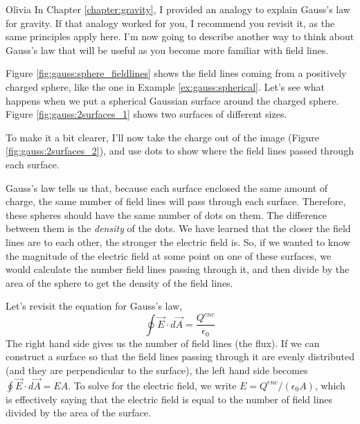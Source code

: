 \begin{studentOpinion}{Olivia}
In Chapter \ref{chapter:gravity}, I provided an analogy to explain Gauss's law for gravity. If that analogy worked for you, I recommend you revisit it, as the same principles apply here. I'm now going to describe another way to think about Gauss's law that will be useful as you become more familiar with field lines.

Figure \ref{fig:gauss:sphere_fieldlines} shows the field lines coming from a positively charged sphere, like the one in Example \ref{ex:gauss:spherical}. 
Let's see what happens when we put a spherical Gaussian surface around the charged sphere. Figure \ref{fig:gauss:2surfaces_1} shows two surfaces of different sizes.

To make it a bit clearer, I'll now take the charge out of the image (Figure \ref{fig:gauss:2surfaces_2}), and use dots to show where the field lines passed through each surface. 

Gauss's law tells us that, because each surface enclosed the same amount of charge, the same number of field lines will pass through each surface. Therefore, these spheres should have the same number of dots on them. The difference between them is the \textit{density} of the dots. We have learned that the closer the field lines are to each other, the stronger the electric field is. So, if we wanted to know the magnitude of the electric field at some point on one of these surfaces, we would calculate the number field lines passing through it, and then divide by the area of the sphere to get the density of the field lines. 

Let's revisit the equation for Gauss's law,
 \begin{equation}
 \oint \vec E\cdot d\vec A=\frac{Q^{enc}}{\epsilon_0}
 \end{equation}
The right hand side gives us the number of field lines (the flux). If we can construct a surface so that the field lines passing through it are evenly distributed (and they are perpendicular to the surface), the left hand side becomes $\oint \vec E\cdot d\vec A= EA$. To solve for the electric field, we write $E=Q^{enc}/(\epsilon_0A)$, which is effectively saying that the electric field is equal to the number of field lines divided by the area of the surface. 
\end{studentOpinion}

